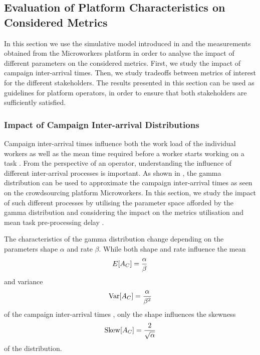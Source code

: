 \subsection{Evaluation of Platform Characteristics on Considered Metrics}\label{sec:cloud:crowdsourcing:performance_evaluation}

In this section we use the simulative model introduced in  and the measurements obtained from the Microworkers platform in order to analyse the impact of different parameters on the considered metrics.
First, we study the impact of campaign inter-arrival times.
Then, we study tradeoffs between metrics of interest for the different stakeholders.
The results presented in this section can be used as guidelines for platform operators, in order to ensure that both stakeholders are sufficiently satisfied.

\subsubsection*{Impact of Campaign Inter-arrival Distributions}

Campaign inter-arrival times \campaignIAT influence both the work load of the individual workers \workerUtilization as well as the mean time required before a worker starts working on a task \preTaskProcessingDelay.
From the perspective of an operator, understanding the influence of different inter-arrival processes is important.
As shown in , the gamma distribution can be used to approximate the campaign inter-arrival times \campaignIAT as seen on the crowdsourcing platform Microworkers.
In this section, we study the impact of such different processes by utilising the parameter space afforded by the gamma distribution and considering the impact on the metrics utilisation \workerUtilization and mean task pre-processing delay \preTaskProcessingDelay.

The characteristics of the gamma distribution change depending on the parameters shape \(\alpha\) and rate \(\beta\).
While both shape and rate influence the mean 
\begin{equation*}
E[A_C] =  \frac{\alpha}{\beta}
\end{equation*}
and variance 
\begin{equation*}
\operatorname{Var}[A_C] =  \frac{\alpha}{\beta^2}
\end{equation*}
of the campaign inter-arrival times \campaignIAT, only the shape influences the skewness 
\begin{equation*}
\operatorname{Skew}[A_C] =  \frac{2}{\sqrt{\alpha}}
\end{equation*}
of the distribution. 


